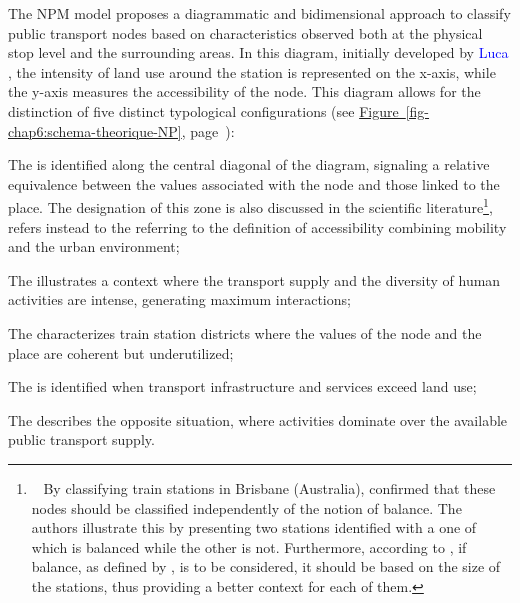 \begin{refsegment}
The \acrshort{NPM} model proposes a diagrammatic and bidimensional approach to classify public transport nodes based on characteristics observed both at the physical stop level and the surrounding areas. In this diagram, initially developed by \textcolor{blue}{Luca} \textcolor{blue}{\textcite[344]{bertolini_nodes_1996}}, the intensity of land use around the station is represented on the x-axis, while the y-axis measures the accessibility of the node. This diagram allows for the distinction of five distinct typological configurations (see \hyperref[fig-chap6:schema-theorique-NP]{Figure~\ref{fig-chap6:schema-theorique-NP}}, page~\pageref{fig-chap6:schema-theorique-NP}):
\begin{customitemize}
    \item The  is identified along the central diagonal of the diagram, signaling a relative equivalence between the values associated with the node and those linked to the place. The designation of this zone is also discussed in the scientific literature\footnote{~
        By classifying train stations in Brisbane (Australia), \textcolor{blue}{\textcite[55]{kamruzzaman_advance_2014}} confirmed that these nodes should be classified independently of the notion of balance. The authors illustrate this by presenting two stations identified with a  one of which is balanced while the other is not. Furthermore, according to \textcolor{blue}{\textcite[194]{reusser_classifying_2008}}, if balance, as defined by \textcolor{blue}{\textcite[202]{bertolini_spatial_1999}}, is to be considered, it should be based on the size of the stations, thus providing a better context for each of them.
    }, \textcolor{blue}{\textcite[243]{yang_tod_2021}} refers instead to the  referring to the definition of accessibility combining mobility and the urban environment;
    \item The  illustrates a context where the transport supply and the diversity of human activities are intense, generating maximum interactions;
    \item The  characterizes train station districts where the values of the node and the place are coherent but underutilized;
    \item The  is identified when transport infrastructure and services exceed land use;
    \item The  describes the opposite situation, where activities dominate over the available public transport supply.
\end{customitemize}%


\end{refsegment}
